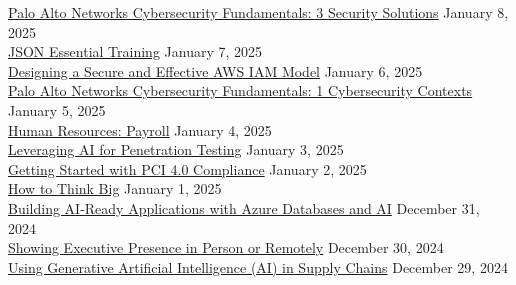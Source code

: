 \documentclass[10pt]{res} %
\begin{document}
\begin{resume}
\href{https://www.linkedin.com/learning/certificates/5e3017d38f26c5b05137ca0ff6941f12691e02d63f1c9efa9728d50392fef77c}{\color{blue}Palo Alto Networks Cybersecurity Fundamentals: 3 Security Solutions} \hfill January 8, 2025 \\
\href{https://www.linkedin.com/learning/certificates/183ae9f0c7ed14fd88a715ee21bea6bd805121a3f0b1b22a89009848574f4b59}{\color{blue}JSON Essential Training} \hfill January 7, 2025 \\
\href{https://www.linkedin.com/learning/certificates/ca46097c0f89fd56afca534ddb9aced72be795945253cdf47c70a5ca03a4a66c}{\color{blue}Designing a Secure and Effective AWS IAM Model} \hfill January 6, 2025 \\
\href{https://www.linkedin.com/learning/certificates/af336ee8cdc640aaab6914b858e1a33529ed4457e4bc634e11953900ebc62146}{\color{blue}Palo Alto Networks Cybersecurity Fundamentals: 1 Cybersecurity Contexts} \hfill January 5, 2025 \\
\href{https://www.linkedin.com/learning/certificates/897ac2c029fc9e5170cbe0b32e350f1d83637adca64b513e58fa8dd9eb5b2a5b}{\color{blue}Human Resources: Payroll} \hfill January 4, 2025 \\
\href{https://www.linkedin.com/learning/certificates/971ef90926daa7d4de17bb50af550856a9ddeb0369e92e4942d31f4b194dd9d7}{\color{blue}Leveraging AI for Penetration Testing} \hfill January 3, 2025 \\
\href{https://www.linkedin.com/learning/certificates/14682595bc6c2a1e51f897656743dab6cb901e50b48fe2793ab4f6d1d7361916}{\color{blue}Getting Started with PCI 4.0 Compliance} \hfill January 2, 2025 \\
\href{https://www.linkedin.com/learning/certificates/aff3a39bb15f06ccd25a8075dbe7713bf49cc3cd4fefb0ff6bc5fb4be67a8466}{\color{blue}How to Think Big} \hfill January 1, 2025 \\
\href{https://www.linkedin.com/learning/certificates/66c3a226362d2bc7f4025cd67a0fc78fba92323bf4e9e1e7be3943816a4baf4b}{\color{blue}Building AI-Ready Applications with Azure Databases and AI} \hfill December 31, 2024 \\
\href{https://www.linkedin.com/learning/certificates/5c4442e749fcabfa5db40542bcad07923897e0f2cda661d3d052ac39d1d293f0}{\color{blue}Showing Executive Presence in Person or Remotely} \hfill December 30, 2024 \\
\href{https://www.linkedin.com/learning/certificates/80c523b89b50e76ca47354fe1564eb5f44748be2f98b4962b8162dcb0e37d799}{\color{blue}Using Generative Artificial Intelligence (AI) in Supply Chains} \hfill December 29, 2024 \\

\end{resume}
\end{document}
